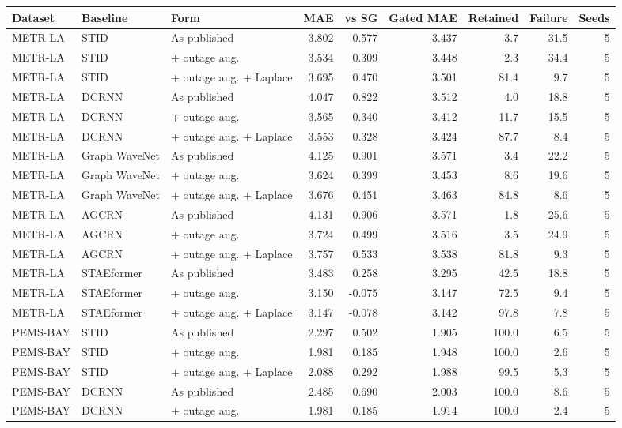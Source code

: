\begin{tabular}{lllrrrrrr}
\toprule
Dataset & Baseline & Form & MAE & vs SG & Gated MAE & Retained & Failure & Seeds \\
\midrule
METR-LA & STID & As published & 3.802 & 0.577 & 3.437 & 3.7 & 31.5 & 5 \\
METR-LA & STID & + outage aug. & 3.534 & 0.309 & 3.448 & 2.3 & 34.4 & 5 \\
METR-LA & STID & + outage aug. + Laplace & 3.695 & 0.470 & 3.501 & 81.4 & 9.7 & 5 \\
METR-LA & DCRNN & As published & 4.047 & 0.822 & 3.512 & 4.0 & 18.8 & 5 \\
METR-LA & DCRNN & + outage aug. & 3.565 & 0.340 & 3.412 & 11.7 & 15.5 & 5 \\
METR-LA & DCRNN & + outage aug. + Laplace & 3.553 & 0.328 & 3.424 & 87.7 & 8.4 & 5 \\
METR-LA & Graph WaveNet & As published & 4.125 & 0.901 & 3.571 & 3.4 & 22.2 & 5 \\
METR-LA & Graph WaveNet & + outage aug. & 3.624 & 0.399 & 3.453 & 8.6 & 19.6 & 5 \\
METR-LA & Graph WaveNet & + outage aug. + Laplace & 3.676 & 0.451 & 3.463 & 84.8 & 8.6 & 5 \\
METR-LA & AGCRN & As published & 4.131 & 0.906 & 3.571 & 1.8 & 25.6 & 5 \\
METR-LA & AGCRN & + outage aug. & 3.724 & 0.499 & 3.516 & 3.5 & 24.9 & 5 \\
METR-LA & AGCRN & + outage aug. + Laplace & 3.757 & 0.533 & 3.538 & 81.8 & 9.3 & 5 \\
METR-LA & STAEformer & As published & 3.483 & 0.258 & 3.295 & 42.5 & 18.8 & 5 \\
METR-LA & STAEformer & + outage aug. & 3.150 & -0.075 & 3.147 & 72.5 & 9.4 & 5 \\
METR-LA & STAEformer & + outage aug. + Laplace & 3.147 & -0.078 & 3.142 & 97.8 & 7.8 & 5 \\
PEMS-BAY & STID & As published & 2.297 & 0.502 & 1.905 & 100.0 & 6.5 & 5 \\
PEMS-BAY & STID & + outage aug. & 1.981 & 0.185 & 1.948 & 100.0 & 2.6 & 5 \\
PEMS-BAY & STID & + outage aug. + Laplace & 2.088 & 0.292 & 1.988 & 99.5 & 5.3 & 5 \\
PEMS-BAY & DCRNN & As published & 2.485 & 0.690 & 2.003 & 100.0 & 8.6 & 5 \\
PEMS-BAY & DCRNN & + outage aug. & 1.981 & 0.185 & 1.914 & 100.0 & 2.4 & 5 \\

\end{tabular}
